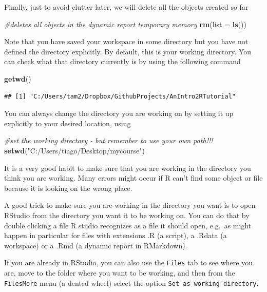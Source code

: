 \documentclass[
]{article}
\newenvironment{Shaded}{\begin{snugshade}}{\end{snugshade}}
\newcommand{\AttributeTok}[1]{\textcolor[rgb]{0.13,0.29,0.53}{#1}}
\newcommand{\CommentTok}[1]{\textcolor[rgb]{0.56,0.35,0.01}{\textit{#1}}}
\newcommand{\FunctionTok}[1]{\textcolor[rgb]{0.13,0.29,0.53}{\textbf{#1}}}
\newcommand{\NormalTok}[1]{#1}
\newcommand{\StringTok}[1]{\textcolor[rgb]{0.31,0.60,0.02}{#1}}
\begin{document}
Finally, just to avoid clutter later, we will delete all the objects
created so far

\begin{Shaded}
\begin{Highlighting}[]
\CommentTok{\#deletes all objects in the dynamic report temporary memory}
\FunctionTok{rm}\NormalTok{(}\AttributeTok{list =} \FunctionTok{ls}\NormalTok{())}
\end{Highlighting}
\end{Shaded}

Note that you have saved your workspace in some directory but you have
not defined the directory explicitly. By default, this is your working
directory. You can check what that directory currently is by using the
following command

\begin{Shaded}
\begin{Highlighting}[]
\FunctionTok{getwd}\NormalTok{()}
\end{Highlighting}
\end{Shaded}

\begin{verbatim}
## [1] "C:/Users/tam2/Dropbox/GithubProjects/AnIntro2RTutorial"
\end{verbatim}

You can always change the directory you are working on by setting it up
explicitly to your desired location, using

\begin{Shaded}
\begin{Highlighting}[]
\CommentTok{\#set the working directory {-} but remember to use your own path!!!}
\FunctionTok{setwd}\NormalTok{(}\StringTok{"C:/Users/tiago/Desktop/mycourse"}\NormalTok{)}
\end{Highlighting}
\end{Shaded}

It is a very good habit to make sure that you are working in the
directory you think you are working. Many errors might occur if R can't
find some object or file because it is looking on the wrong place.

A good trick to make sure you are working in the directory you want is
to open RStudio from the directory you want it to be working on. You can
do that by double clicking a file R studio recognizes as a file it
should open, e.g.~as might happen in particular for files with
extensions .R (a script), a .Rdata (a workspace) or a .Rmd (a dynamic
report in RMarkdown).

If you are already in RStudio, you can also use the \texttt{Files} tab
to see where you are, move to the folder where you want to be working,
and then from the \texttt{Files\textbar{}More} menu (a dented wheel)
select the option \texttt{Set\ as\ working\ directory}.
\end{document}
